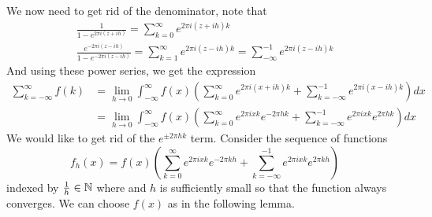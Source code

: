 \documentclass{homework}
\begin{document}
\begin{solution}
                                                                                We now need to get rid of the denominator, note that
                                                                                \begin{gather*}
                                                                                \frac{1}{1-e^{2\pi i (z + ih)}} = \sum_{k=0}^\infty e^{2\pi i (z+ ih)k}\\
                                                                                \frac{e^{-2\pi i (z - ih)}}{1-e^{-2\pi i (z - ih)}} = \sum_{k=1}^\infty e^{2\pi i (z- ih)k} = \sum_{-\infty}^{-1} e^{2\pi i (z-ih)k}
                                                                                \end{gather*}
                                                                                And using these power series, we get the expression
                                                                                \begin{align*}
                                                                                \sum_{k=-\infty} ^\infty f(k) &= \lim_{h\to 0}\int_{-\infty}^\infty f(x)\left(\sum_{k=0}^{\infty}e^{2\pi i (x+ih)k} + \sum_{k=-\infty}^{-1} e^{2\pi i (x-ih)k}\right) dx\\
                                                                                &= \lim_{h\to 0}\int_{-\infty}^\infty f(x)\left(\sum_{k=0}^{\infty}e^{2\pi i xk}e^{-2\pi hk} + \sum_{k=-\infty}^{-1} e^{2\pi i xk}e^{2\pi hk}\right) dx
                                                                                \end{align*}
                                                                                We would like to get rid of the $e^{\pm 2\pi h k}$ term.
                                                                                Consider the sequence of functions 
                                                                                \[
                                                                                f_h(x) = f(x)\left(\sum_{k=0}^{\infty}e^{2\pi i xk}e^{-2\pi kh} + \sum_{k=-\infty}^{-1} e^{2\pi i xk}e^{2\pi kh}\right)
                                                                                \]
                                                                                indexed by $\frac{1}{h}\in \mathbb{N}$ where and $h$ is sufficiently small so that the function always converges. We can choose $f(x)$ as in the following lemma.
                                                                                \begin{lemma}\label{sum_fh_converges}

\end{lemma}
\end{solution}
\end{document}
